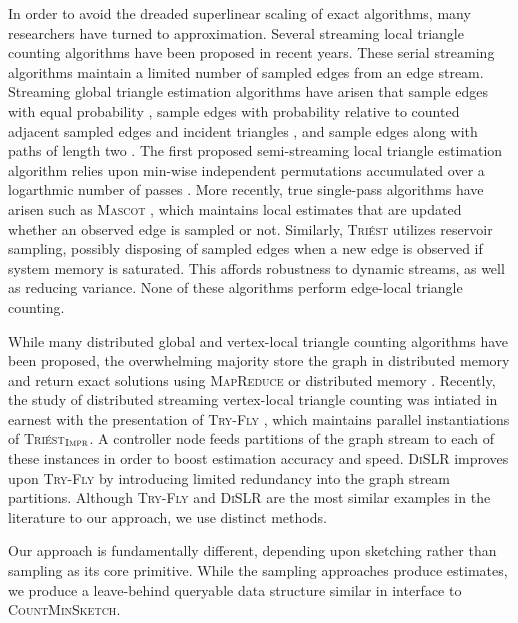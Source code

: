 \documentclass{report}
\newcommand{\algoname}[1]{\textnormal{\textsc{#1}}}
\begin{document}
In order to avoid the dreaded superlinear scaling of exact algorithms, many researchers have turned to approximation.
Several streaming local triangle counting algorithms have been proposed in recent years.
These serial streaming algorithms  maintain a limited number of sampled edges from an edge stream.
Streaming global triangle estimation algorithms have arisen that sample edges with equal probability \cite{tsourakakis2009doulion}, sample edges with probability relative to counted adjacent sampled edges and incident triangles \cite{ahmed2017sampling}, and sample edges along with paths of length two \cite{jha2013space}. 
The first proposed semi-streaming local triangle estimation algorithm relies upon min-wise independent permutations accumulated over a logarthmic number of passes \cite{becchetti2008efficient}. 
More recently, true single-pass algorithms have arisen such as \algoname{Mascot} \cite{lim2015mascot}, which maintains local estimates that are updated whether an observed edge is sampled or not.
Similarly, \algoname{Tri\'est} \cite{stefani2017triest} utilizes reservoir sampling, possibly disposing of sampled edges when a new edge is observed if system memory is saturated.
This affords robustness to dynamic streams, as well as reducing variance.
None of these algorithms perform edge-local triangle counting.

While many distributed global and vertex-local triangle counting algorithms have been proposed, the overwhelming majority store the graph in distributed memory and return exact solutions using \algoname{MapReduce} \cite{suri2011counting} or distributed memory \cite{arifuzzaman2013patric, pearce2017triangle}.
Recently, the study of distributed streaming vertex-local triangle counting was intiated in earnest with the presentation of \algoname{Try-Fly} \cite{shin2018tri}, which maintains parallel instantiations of \algoname{Tri\'est$_{\algoname{Impr}}$}.
A controller node feeds partitions of the graph stream to each of these instances in order to boost estimation accuracy and speed.
\algoname{DiSLR} \cite{shin2018dislr} improves upon \algoname{Try-Fly} by introducing limited redundancy into the graph stream partitions.
Although \algoname{Try-Fly} and \algoname{DiSLR} are the most similar examples in the literature to our approach, we use distinct methods.

Our approach is fundamentally different, depending upon sketching rather than sampling as its core primitive. 
While the sampling approaches produce estimates, we produce a leave-behind queryable data structure similar in interface to \algoname{CountMinSketch}.
\end{document}
